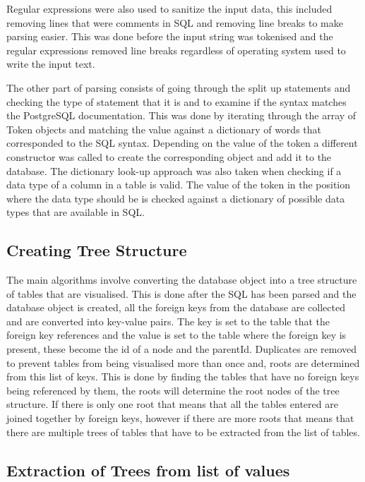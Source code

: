 Regular expressions were also used to sanitize the input data, this included removing lines that were comments in SQL and removing line breaks to make parsing easier. This was done before the input string was tokenised and the regular expressions removed line breaks regardless of operating system used to write the input text.

The other part of parsing consists of going through the split up statements and checking the type of statement that it is and to examine if the syntax matches the PostgreSQL documentation.  This was done by iterating through the array of Token objects and matching the value against a dictionary of words that corresponded to the SQL syntax. Depending on the value of the token a different constructor was called to create the corresponding object and add it to the database. The dictionary look-up approach was also taken when checking if a data type of a column in a table is valid. The value of the token in the position where the data type should be is checked against a dictionary of possible data types that are available in SQL.


\subsection{Creating Tree Structure}

The main algorithms involve converting the database object into a tree structure of tables that are visualised. This is done after the SQL has been parsed and the database object is created, all the foreign keys from the database are collected and are converted into key-value pairs. The key is set to the table that the foreign key references and the value is set to the table where the foreign key is present, these become the id of a node and the parentId. Duplicates are removed to prevent tables from being visualised more than once and, roots are determined from this list of keys. This is done by finding the tables that have no foreign keys being referenced by them, the roots will determine the root nodes of the tree structure. If there is only one root that means that all the tables entered are joined together by foreign keys, however if there are more roots that means that there are multiple trees of tables that have to be extracted from the list of tables. 

\subsection{Extraction of Trees from list of values}


